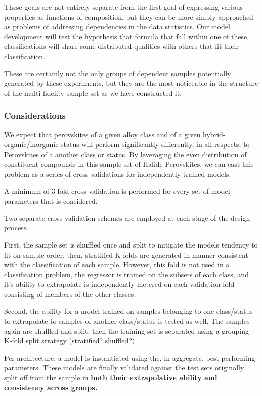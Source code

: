 \documentclass[aip, jmp, amsmath, amssymb]{revtex4-2}
\begin{document}
These goals are not entirely separate from the first goal of
expressing various properties as functions of composition, but they
can be more simply approached as problems of addressing dependencies
in the data statistics. Our model development will test the hypothesis
that formula that fall within one of these classifications will share
some distributed qualities with others that fit their classification.

These are certainly not the only groups of dependent samples
potentially generated by these experiments, but they are the most
noticeable in the structure of the multi-fidelity sample set as we
have constructed it.
\subsubsection*{Considerations}
\label{sec:org4a01818}
We expect that perovskites of a given alloy class and of a given
hybrid-organic/inorganic status will perform significantly
differently, in all respects, to Perovskites of a another class or
status. By leveraging the even distribution of constituent compounds
in this sample set of Halide Perovskites, we can cast this problem as
a series of cross-validations for independently trained models.

A minimum of 3-fold cross-validation is performed for every set of
model parameters that is considered. 

Two separate cross validation schemes are employed at each stage of
the design process.

First, the sample set is shuffled once and split to mitigate the
models tendency to fit on sample order, then, stratified K-folds are
generated in manner consistent with the classification of each
sample. However, this fold is not used in a classification problem,
the regressor is trained on the subsets of each class, and it's
ability to extrapolate is independently metered on each validation
fold consisting of members of the other classes.

Second, the ability for a model trained on samples belonging to one
class/status to extrapolate to samples of another class/status is
tested as well. The samples again are shuffled and split. then the
training set is separated using a grouping K-fold split strategy (stratified? shuffled?)

Per architecture, a model is instantiated using the, in aggregate,
best performing parameters. These models are finally validated against
the test sets originally split off from the sample in \textbf{both their
extrapolative ability and consistency across groups.}
\end{document}

